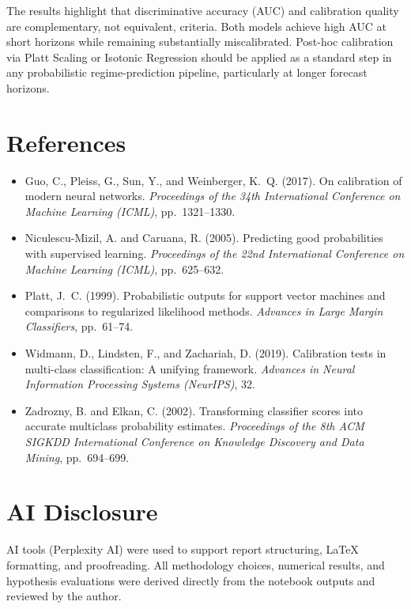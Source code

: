 \documentclass[12pt]{article}
\begin{document}
The results highlight that discriminative accuracy (AUC) and calibration quality
are complementary, not equivalent, criteria.
Both models achieve high AUC at short horizons while remaining substantially
miscalibrated.
Post-hoc calibration via Platt Scaling or Isotonic Regression should be applied
as a standard step in any probabilistic regime-prediction pipeline, particularly
at longer forecast horizons.

\section*{References}

\small
\begin{itemize}[leftmargin=1.5em,itemsep=1pt,topsep=4pt]
  \item Guo, C., Pleiss, G., Sun, Y., and Weinberger, K.~Q. (2017). On calibration
    of modern neural networks. \textit{Proceedings of the 34th International
    Conference on Machine Learning (ICML)}, pp.\ 1321--1330.
  \item Niculescu-Mizil, A. and Caruana, R. (2005). Predicting good probabilities
    with supervised learning. \textit{Proceedings of the 22nd International
    Conference on Machine Learning (ICML)}, pp.\ 625--632.
  \item Platt, J.~C. (1999). Probabilistic outputs for support vector machines and
    comparisons to regularized likelihood methods.
    \textit{Advances in Large Margin Classifiers}, pp.\ 61--74.
  \item Widmann, D., Lindsten, F., and Zachariah, D. (2019). Calibration tests in
    multi-class classification: A unifying framework.
    \textit{Advances in Neural Information Processing Systems (NeurIPS)}, 32.
  \item Zadrozny, B. and Elkan, C. (2002). Transforming classifier scores into
    accurate multiclass probability estimates. \textit{Proceedings of the 8th ACM
    SIGKDD International Conference on Knowledge Discovery and Data Mining},
    pp.\ 694--699.
\end{itemize}

\section*{AI Disclosure}
AI tools (Perplexity AI) were used to support report structuring, LaTeX
formatting, and proofreading.
All methodology choices, numerical results, and hypothesis evaluations were
derived directly from the notebook outputs and reviewed by the author.
\end{document}
